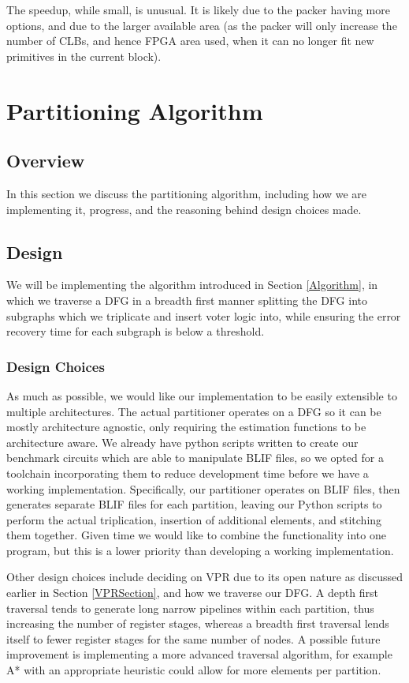 \documentclass[12pt,final,oneside]{memoir} %
\begin{document}
The speedup, while small, is unusual. It is likely due to the packer having more options, and due to the larger available area (as the packer will only increase the number of \acp{CLB}, and hence \ac{FPGA} area used, when it can no longer fit new primitives in the current block).


\chapter{Partitioning Algorithm}
\section{Overview}
In this section we discuss the partitioning algorithm, including how we are implementing it, progress, and the reasoning behind design choices made.
\section{Design}
We will be implementing the algorithm introduced in Section \ref{Algorithm}, in which we traverse a \ac{DFG} in a breadth first manner splitting the \ac{DFG} into subgraphs which we triplicate and insert voter logic into, while ensuring the error recovery time for each subgraph is below a threshold.

\subsection{Design Choices}
As much as possible, we would like our implementation to be easily extensible to multiple architectures. The actual partitioner operates on a \ac{DFG} so it can be mostly architecture agnostic, only requiring the estimation functions to be architecture aware.
We already have python scripts written to create our benchmark circuits which are able to manipulate \ac{BLIF} files, so we opted for a toolchain incorporating them to reduce development time before we have a working implementation. Specifically, our partitioner operates on \ac{BLIF} files, then generates separate \ac{BLIF} files for each partition, leaving our Python scripts to perform the actual triplication, insertion of additional elements, and stitching them together. Given time we would like to combine the functionality into one program, but this is a lower priority than developing a working implementation.

Other design choices include deciding on \ac{VPR} due to its open nature as discussed earlier in Section \ref{VPRSection}, and how we traverse our \ac{DFG}. A depth first traversal tends to generate long narrow pipelines within each partition, thus increasing the number of register stages, whereas a breadth first traversal lends itself to fewer register stages for the same number of nodes. A possible future improvement is implementing a more advanced traversal algorithm, for example A* with an appropriate heuristic could allow for more elements per partition.
\end{document}
